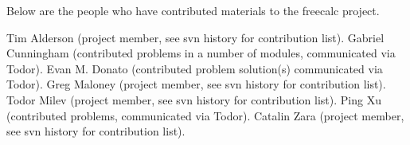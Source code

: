Below are the people who have contributed materials to the freecalc project.

Tim Alderson (project member, see svn history for contribution list).
Gabriel Cunningham (contributed problems in a number of modules, communicated via Todor).
Evan M. Donato (contributed problem solution(s) communicated via Todor).
Greg Maloney (project member, see svn history for contribution list).
Todor Milev (project member, see svn history for contribution list).
Ping Xu (contributed problems, communicated via Todor).
Catalin Zara (project member, see svn history for contribution list).
